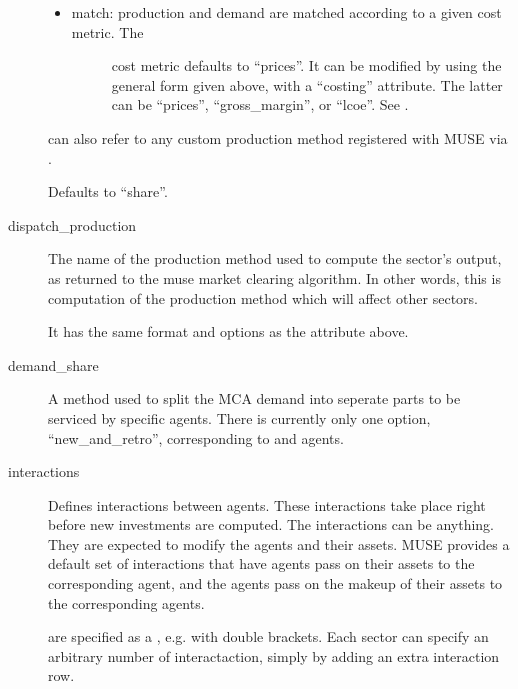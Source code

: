 \documentclass[letterpaper,10pt,english]{sphinxmanual}
\begin{document}
\begin{description}
\begin{itemize}
\begin{description}
\end{description}

\item {} \begin{description}
\item[{match: production and demand are matched according to a given cost metric. The}] \leavevmode
cost metric defaults to “prices”. It can be modified by using the general form
given above, with a “costing” attribute. The latter can be “prices”,
“gross\_margin”, or “lcoe”.
See .

\end{description}

\end{itemize}

 can also refer to any custom production method registered with MUSE via
.

Defaults to “share”.

\item[{dispatch\_production}] \leavevmode
The name of the production method used to compute the sector’s output, as returned
to the muse market clearing algorithm. In other words, this is computation of the
production method which will affect other sectors.

It has the same format and options as the  attribute above.

\item[{demand\_share}] \leavevmode
A method used to split the MCA demand into seperate parts to be serviced by specific
agents. There is currently only one option, “new\_and\_retro”, corresponding to 
and  agents.

\item[{interactions}] \leavevmode
Defines interactions between agents. These interactions take place right before new
investments are computed. The interactions can be anything. They are expected to
modify the agents and their assets. MUSE provides a default set of interactions that
have  agents pass on their assets to the corresponding  agent, and the
 agents pass on the make\sphinxhyphen{}up of their assets to the corresponding 
agents.

 are specified as a {\hyperref[\detokenize{inputs/toml_primer:toml-array}]{}}, e.g. with double
brackets. Each sector can specify an arbitrary number of interactaction, simply by
adding an extra interaction row.


\end{description}
\end{document}
